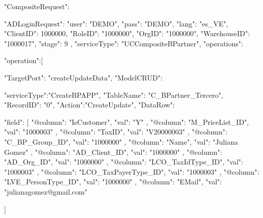 {

    "CompositeRequest":{
        
         "ADLoginRequest": {
        "user": "DEMO",
        "pass": "DEMO",
        "lang": "es_VE",
        "ClientID": 1000000,
        "RoleID": "1000000",
        "OrgID": "1000000",
        "WarehouseID": "1000017",
        "stage": 9
      },
    "serviceType": "UCCompositeBPartner",
        "operations":{
            "operation":[
                {
                "TargetPort": "createUpdateData",
                "ModelCRUD": {
                    "serviceType":"CreateBPAPP",
                    "TableName": "C_BPartner_Tercero",
                    "RecordID": "0",
                    "Action":"CreateUpdate",
                    "DataRow": {
                "field": [
                    {
                        "@column": "IsCustomer",
                        "val": "Y"
                    },
                    {
                        "@column": "M_PriceList_ID",
                        "val": "1000003"
                    },
                    {
                        "@column": "TaxID",
                        "val": "V20000003"
                    },
                    {
                        "@column": "C_BP_Group_ID",
                        "val": "1000000"
                    },
                    {
                        "@column": "Name",
                        "val": "Juliana Gomez"
                    },
                    {
                        "@column": "AD_Client_ID",
                        "val": "1000000"
                    },
                    {
                        "@column": "AD_Org_ID",
                        "val": "1000000"
                    },
                    {
                        "@column": "LCO_TaxIdType_ID",
                        "val": "1000003"
                    },
                    {
                        "@column": "LCO_TaxPayerType_ID",
                        "val": "1000003"
                    },
                    {
                        "@column": "LVE_PersonType_ID",
                        "val": "1000000"
                    },
                    {
                        "@column": "EMail",
                        "val": "julianagomez@gmail.com"
                    }
             
                ]
                }

                }

}}}}
